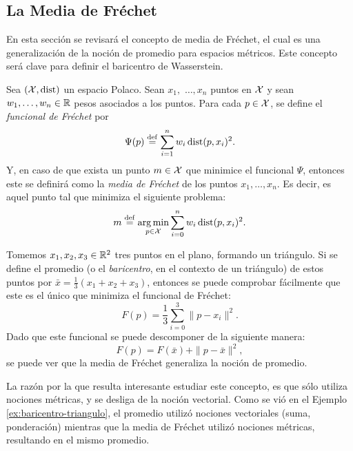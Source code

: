 {{	  \subsection*{La Media de Fréchet}\label{ssec:la-media-de-Frechet}
	  {
		  En esta sección se revisará el concepto de media de Fréchet, el cual es una generalización de la noción de promedio para espacios métricos. Este concepto será clave para definir el baricentro de Wasserstein.
		  \begin{definition}
			  Sea $(\mathcal{X}, \operatorname{dist})$ un espacio Polaco. Sean $x_1,$ $\ldots, x_n$ puntos en $\mathcal{X}$ y sean $w_1,\ldots,w_n\in\mathbb{R}$ pesos asociados a los puntos. Para cada $p\in\mathcal{X}$, se define el \emph{funcional de Fréchet} por
			  \begin{equation}
				  \label{eq:funcionalFrechet}
				  \Psi(p) \stackrel{\mathrm{def}}{=} \sum_{i=1}^{n} w_i \operatorname{dist}(p, x_i)^2.
			  \end{equation}
			  Y, en caso de que exista un punto $m \in \mathcal{X}$ que minimice el funcional $\Psi$, entonces este se definirá como la \emph{media de Fréchet} de los puntos $x_1,\ldots, x_n$. Es decir, es aquel punto tal que minimiza el siguiente problema:
			  \begin{equation}
				  \label{eq:mediaFrechet}
				  m \stackrel{\mathrm{def}}{=} \operatorname*{arg\,m{i}n}_{p \in \mathcal{X}} \sum_{i=0}^{n} w_i \operatorname{dist}(p, x_i)^2.
			  \end{equation}
		  \end{definition}

		  \begin{example}\label{ex:baricentro-triangulo}
			  Tomemos $x_1, x_2, x_3 \in \mathbb{R}^2$ tres puntos en el plano, formando un triángulo. Si se define el promedio (o el \textit{baricentro}, en el contexto de un triángulo) de estos puntos por $\bar x = \frac{1}{3} (x_1 + x_2 + x_3)$, entonces se puede comprobar fácilmente que este es el único que minimiza el funcional de Fréchet:
			  \begin{equation}
				  F(p) = \frac{1}{3} \sum_{i=0}^{3} \|p - x_i\|^2.
			  \end{equation}
			  Dado que este funcional se puede descomponer de la siguiente manera:
			  \begin{equation}
				  F(p) = F(\bar x) + \|p-\bar x\|^2,
			  \end{equation}
			  se puede ver que la media de Fréchet generaliza la noción de promedio.
		  \end{example}

		  \begin{remark}
			  La razón por la que resulta interesante estudiar este concepto, es que sólo utiliza nociones métricas, y se desliga de la noción vectorial. Como se vió en el Ejemplo \ref{ex:baricentro-triangulo}, el promedio utilizó nociones vectoriales (suma, ponderación) mientras que la media de Fréchet utilizó nociones métricas, resultando en el mismo promedio.


\end{remark}}}}
